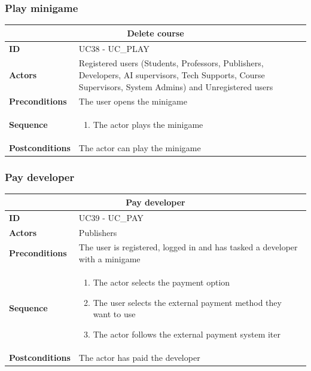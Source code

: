 \subsubsection{Play minigame}
\begin{tabular}{|m{2.5cm}|m{8cm}|}
	\hline
	\multicolumn{2}{|c|}{Delete course} \\
	\hline
	\textbf{ID} & UC38 - UC\_PLAY \\
	\hline
	\textbf{Actors} & Registered users (Students, Professors, Publishers, Developers, AI supervisors, Tech Supports, Course Supervisors, System Admins) and Unregistered users \\
	\hline
	\textbf{Preconditions} & The user opens the minigame \\
	\hline
	\textbf{Sequence} & 
	\begin{enumerate}
		\item The actor plays the minigame
	\end{enumerate} \\
	\hline
	\textbf{Postconditions} & The actor can play the minigame \\
	\hline
\end{tabular}

\subsubsection{Pay developer}
\begin{tabular}{|m{2.5cm}|m{8cm}|}
	\hline
	\multicolumn{2}{|c|}{Pay developer} \\
	\hline
	\textbf{ID} & UC39 - UC\_PAY \\
	\hline
	\textbf{Actors} & Publishers \\
	\hline
	\textbf{Preconditions} & The user is registered, logged in and has tasked a developer with a minigame \\
	\hline
	\textbf{Sequence} & 
	\begin{enumerate}
		\item The actor selects the payment option
		\item The user selects the external payment method they want to use
		\item The actor follows the external payment system iter
	\end{enumerate} \\
	\hline
	\textbf{Postconditions} & The actor has paid the developer \\
	\hline
\end{tabular}

